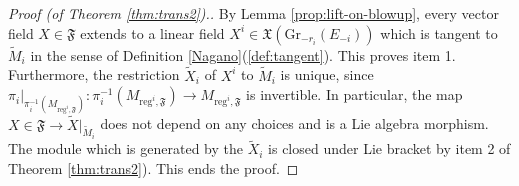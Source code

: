 \documentclass[10pt]{article}
\theoremstyle{plain}
\theoremstyle{definition}
\theoremstyle{remark}
\begin{document}
\begin{proof}[Proof (of Theorem \ref{thm:trans2}).]
By Lemma \ref{prop:lift-on-blowup}, every vector field $X\in \mathfrak F$ extends to a linear field $X^i\in \mathfrak X(\mathrm{Gr}_{-r_i}(E_{-i}))$ which is tangent to $\widetilde M_i$ in the sense of Definition \ref{Nagano}(\ref{def:tangent}). This proves item 1. 
Furthermore, the restriction $\widetilde X_i$ of $X^i$ to $\widetilde M_i$ is unique, since $\pi_i|_{\pi_i^{-1}(M_{\mathrm{reg}^{i}, \mathfrak F})}\colon\pi_i^{-1}(M_{\mathrm{reg}^{i}, \mathfrak F})\longrightarrow M_{\mathrm{reg}^{i}, \mathfrak F}$ is invertible. In particular, the map $X\in \mathfrak F \longrightarrow \widetilde X|_{\widetilde{M}_i}$ does not depend on any choices and is a Lie algebra morphism. The module which is generated by the $\widetilde X_i$ is closed under Lie bracket by item 2 of Theorem \ref{thm:trans2}). This ends the proof.
\end{proof}
\end{document}
